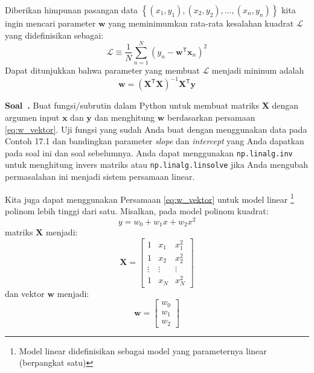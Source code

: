 \documentclass[a4paper,11pt,bahasa]{article} %
\newcommand{\pyinline}[1]{\texttt{#1}}
\newcounter{soal}%
\newenvironment{soal}[1][]{\refstepcounter{soal}\par\medskip
   \noindent \textbf{Soal~\thesoal. #1} \sffamily}{\medskip}
\begin{document}
Diberikan himpunan pasangan data
$\left\{(x_{1},y_{1}), (x_{2}, y_{2}), \ldots, (x_{n}, y_{n})\right\}$
kita ingin
mencari parameter $\mathbf{w}$ yang meminimumkan rata-rata kesalahan kuadrat
$\mathcal{L}$ yang didefinisikan sebagai:
\begin{equation}
\mathcal{L} \equiv \frac{1}{N} \sum_{n=1}^{N} \left( y_{n} - \mathbf{w}^{\mathsf{T}}
\mathbf{x}_{n} \right)^2
\end{equation}
Dapat ditunjukkan bahwa parameter yang membuat $\mathcal{L}$ menjadi mininum adalah
\begin{equation}
\mathbf{w} = \left(\mathbf{X}^{\mathsf{T}}\mathbf{X} \right)^{-1} \mathbf{X}^{\mathsf{T}} \mathbf{y}
\label{eq:w_vektor}
\end{equation}

\begin{soal}
Buat fungsi/subrutin dalam Python untuk membuat matriks $\mathbf{X}$ dengan argumen
input $\mathbf{x}$ dan $\mathbf{y}$ dan menghitung $\mathbf{w}$ berdasarkan
persamaan \eqref{eq:w_vektor}.
Uji fungsi yang sudah Anda buat dengan menggunakan data pada Contoh 17.1 dan bandingkan
parameter \textit{slope} dan \textit{intercept} yang Anda dapatkan pada soal ini dan
soal sebelumnya. Anda dapat menggunakan \pyinline{np.linalg.inv} untuk menghitung
invers matriks atau \pyinline{np.linalg.linsolve} jika Anda mengubah permasalahan
ini menjadi sistem persamaan linear.
\end{soal}

Kita juga dapat menggunakan Persamaan \eqref{eq:w_vektor} untuk model linear
\footnote{Model linear didefinisikan sebagai model yang parameternya linear
(berpangkat satu)} polinom lebih tinggi dari satu. Misalkan, pada model
polinom kuadrat:
\begin{equation}
y = w_{0} + w_{1} x + w_{2} x^2
\end{equation}
matriks $\mathbf{X}$ menjadi:
\begin{equation}
\mathbf{X} = \begin{bmatrix}
1 & x_{1} & x_{1}^2 \\
1 & x_{2} & x_{2}^2 \\
\vdots & \vdots & \vdots \\
1 & x_{N} & x_{N}^2
\end{bmatrix}
\end{equation}
dan vektor $\mathbf{w}$ menjadi:
\begin{equation}
\mathbf{w} = 
\begin{bmatrix}
w_{0} \\
w_{1} \\
w_{2}
\end{bmatrix}
\end{equation}
\end{document}
